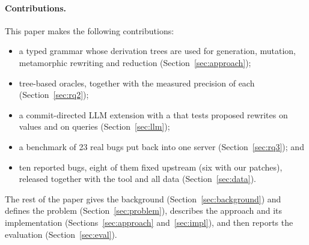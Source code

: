 \paragraph{Contributions.} This paper makes the following contributions:
\begin{itemize}
  \item a typed \pg grammar whose derivation trees are used for generation,
    mutation, metamorphic rewriting and reduction (Section~\ref{sec:approach});
  \item tree-based oracles, together with the measured precision of each
    (Section~\ref{sec:rq2});
  \item a commit-directed LLM extension with a \gate that tests proposed
    rewrites on values and on queries (Section~\ref{sec:llm});
  \item a benchmark of 23 real \pg bugs put back into one server
    (Section~\ref{sec:rq3}); and
  \item ten reported \pg bugs, eight of them fixed upstream (six with our
    patches), released together with the tool and all data
    (Section~\ref{sec:data}).
\end{itemize}
The rest of the paper gives the background (Section~\ref{sec:background}) and
defines the problem (Section~\ref{sec:problem}), describes
the approach and its implementation (Sections~\ref{sec:approach}
and~\ref{sec:impl}), and then reports the evaluation (Section~\ref{sec:eval}).
